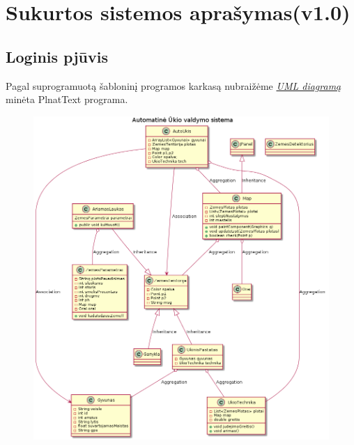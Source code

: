 \documentclass[oneside]{VUMIFPSkursinis}
\begin{document}
\section{Sukurtos sistemos aprašymas(v1.0)}

\subsection{Loginis pjūvis}
Pagal suprogramuotą šabloninį programos karkasą nubraižėme  \hyperref[fig:uml]{\textit{ UML diagramą}} minėta PlnatText programa.
	\begin{figure}[H]	
	\centering	
		\includegraphics[width=\textwidth,height=\textheight,keepaspectratio]{uml.png}	
		\caption{}
		\label{fig:uml}
	\end{figure}
\end{document}
